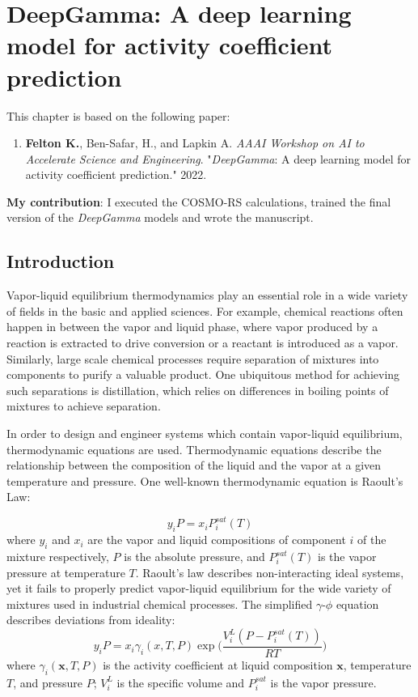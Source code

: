 \chapter{DeepGamma: A deep learning model for activity coefficient prediction}\label{ch:deep_gamma} 
This chapter is based on the following paper:
\begin{enumerate}
\item \textbf{Felton K.}, Ben-Safar, H., and Lapkin A. \textit{AAAI Workshop on AI to Accelerate Science and Engineering}. "\textit{DeepGamma}: A deep learning model for activity coefficient prediction." 2022.
\end{enumerate}
\textbf{My contribution}: I executed the COSMO-RS calculations, trained the final version of the \textit{DeepGamma} models and wrote the manuscript.

\section{Introduction}

Vapor-liquid equilibrium thermodynamics play an essential role in a wide variety of fields in the basic and applied sciences. For example, chemical reactions often happen in between the vapor and liquid phase, where vapor produced by a reaction is extracted to drive conversion or a reactant is introduced as a vapor. Similarly, large scale chemical processes require separation of mixtures into components to purify a valuable product. One ubiquitous method for achieving such separations is distillation, which relies on differences in boiling points of mixtures to achieve separation.

In order to design and engineer systems which contain vapor-liquid equilibrium, thermodynamic equations are used. Thermodynamic equations describe the relationship between the composition of the liquid and the vapor at a given temperature and pressure. One well-known thermodynamic equation is Raoult's Law: 

\begin{equation}
    \label{ideal-gas}
    y_i P = x_iP_i^{sat}(T)
\end{equation}
where $y_i$ and $x_i$ are the vapor and liquid compositions of component $i$ of the mixture respectively, $P$ is the absolute pressure, and $P_i^{sat}(T)$ is the vapor pressure at temperature $T$. Raoult's law describes non-interacting ideal systems, yet it fails to properly predict vapor-liquid equilibrium for the wide variety of mixtures used in industrial chemical processes. The simplified $\gamma$-$\phi$ equation describes deviations from ideality:
\begin{equation}
    \label{gamma-phi}
    y_i P = x_i \gamma_i(x,T,P)   \exp \biggl(\frac{V_i^L(P-P_i^{sat}(T))}{RT}\biggr)
\end{equation}
where $\gamma_i(\mathbf x,T,P)$ is the activity coefficient at liquid composition $\mathbf x$,  temperature $T$, and pressure $P$; $V_i^L$ is the specific volume and $P_i^{sat}$ is the vapor pressure.  

